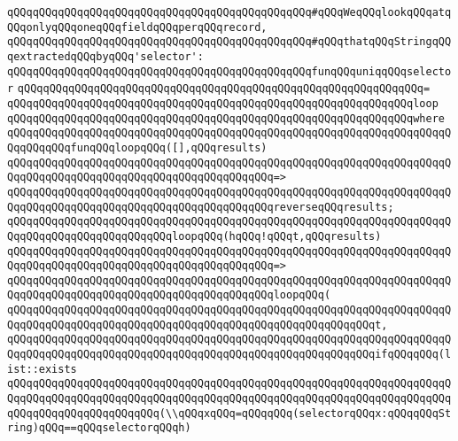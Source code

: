 \verb|qQQqqQQqqQQqqQQqqQQqqQQqqQQqqQQqqQQqqQQqqQQqqQQq#qQQqWeqQQqlookqQQqatqQQqonlyqQQqoneqQQqfieldqQQqperqQQqrecord,|\newline
\verb|qQQqqQQqqQQqqQQqqQQqqQQqqQQqqQQqqQQqqQQqqQQqqQQq#qQQqthatqQQqStringqQQqextractedqQQqbyqQQq'selector':|\newline
\newline
\verb|qQQqqQQqqQQqqQQqqQQqqQQqqQQqqQQqqQQqqQQqqQQqqQQqfunqQQquniqqQQqselector|\newline
\verb|qQQqqQQqqQQqqQQqqQQqqQQqqQQqqQQqqQQqqQQqqQQqqQQqqQQqqQQqqQQqqQQq=|\newline
\verb|qQQqqQQqqQQqqQQqqQQqqQQqqQQqqQQqqQQqqQQqqQQqqQQqqQQqqQQqqQQqqQQqloop|\newline
\verb|qQQqqQQqqQQqqQQqqQQqqQQqqQQqqQQqqQQqqQQqqQQqqQQqqQQqqQQqqQQqqQQqwhere|\newline
\verb|qQQqqQQqqQQqqQQqqQQqqQQqqQQqqQQqqQQqqQQqqQQqqQQqqQQqqQQqqQQqqQQqqQQqqQQqqQQqqQQqfunqQQqloopqQQq([],qQQqresults)|\newline
\verb|qQQqqQQqqQQqqQQqqQQqqQQqqQQqqQQqqQQqqQQqqQQqqQQqqQQqqQQqqQQqqQQqqQQqqQQqqQQqqQQqqQQqqQQqqQQqqQQqqQQqqQQqqQQqqQQq=>|\newline
\verb|qQQqqQQqqQQqqQQqqQQqqQQqqQQqqQQqqQQqqQQqqQQqqQQqqQQqqQQqqQQqqQQqqQQqqQQqqQQqqQQqqQQqqQQqqQQqqQQqqQQqqQQqqQQqqQQqreverseqQQqresults;|\newline
\newline
\verb|qQQqqQQqqQQqqQQqqQQqqQQqqQQqqQQqqQQqqQQqqQQqqQQqqQQqqQQqqQQqqQQqqQQqqQQqqQQqqQQqqQQqqQQqqQQqqQQqloopqQQq(hqQQq!qQQqt,qQQqresults)|\newline
\verb|qQQqqQQqqQQqqQQqqQQqqQQqqQQqqQQqqQQqqQQqqQQqqQQqqQQqqQQqqQQqqQQqqQQqqQQqqQQqqQQqqQQqqQQqqQQqqQQqqQQqqQQqqQQqqQQq=>|\newline
\verb|qQQqqQQqqQQqqQQqqQQqqQQqqQQqqQQqqQQqqQQqqQQqqQQqqQQqqQQqqQQqqQQqqQQqqQQqqQQqqQQqqQQqqQQqqQQqqQQqqQQqqQQqqQQqqQQqloopqQQq(|\newline
\verb|qQQqqQQqqQQqqQQqqQQqqQQqqQQqqQQqqQQqqQQqqQQqqQQqqQQqqQQqqQQqqQQqqQQqqQQqqQQqqQQqqQQqqQQqqQQqqQQqqQQqqQQqqQQqqQQqqQQqqQQqqQQqqQQqt,|\newline
\newline
\verb|qQQqqQQqqQQqqQQqqQQqqQQqqQQqqQQqqQQqqQQqqQQqqQQqqQQqqQQqqQQqqQQqqQQqqQQqqQQqqQQqqQQqqQQqqQQqqQQqqQQqqQQqqQQqqQQqqQQqqQQqqQQqqQQqifqQQqqQQq(list::exists|\newline
\verb|qQQqqQQqqQQqqQQqqQQqqQQqqQQqqQQqqQQqqQQqqQQqqQQqqQQqqQQqqQQqqQQqqQQqqQQqqQQqqQQqqQQqqQQqqQQqqQQqqQQqqQQqqQQqqQQqqQQqqQQqqQQqqQQqqQQqqQQqqQQqqQQqqQQqqQQqqQQqqQQqqQQq(\\qQQqxqQQq=qQQqqQQq(selectorqQQqx:qQQqqQQqString)qQQq==qQQqselectorqQQqh)|\newline
